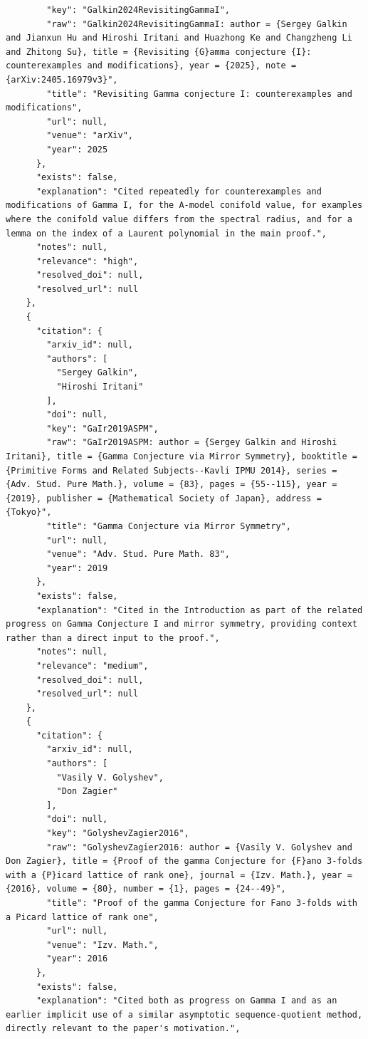 \documentclass[11pt]{article}
\begin{document}
\begin{verbatim}
        "key": "Galkin2024RevisitingGammaI",
        "raw": "Galkin2024RevisitingGammaI: author = {Sergey Galkin and Jianxun Hu and Hiroshi Iritani and Huazhong Ke and Changzheng Li and Zhitong Su}, title = {Revisiting {G}amma conjecture {I}: counterexamples and modifications}, year = {2025}, note = {arXiv:2405.16979v3}",
        "title": "Revisiting Gamma conjecture I: counterexamples and modifications",
        "url": null,
        "venue": "arXiv",
        "year": 2025
      },
      "exists": false,
      "explanation": "Cited repeatedly for counterexamples and modifications of Gamma I, for the A-model conifold value, for examples where the conifold value differs from the spectral radius, and for a lemma on the index of a Laurent polynomial in the main proof.",
      "notes": null,
      "relevance": "high",
      "resolved_doi": null,
      "resolved_url": null
    },
    {
      "citation": {
        "arxiv_id": null,
        "authors": [
          "Sergey Galkin",
          "Hiroshi Iritani"
        ],
        "doi": null,
        "key": "GaIr2019ASPM",
        "raw": "GaIr2019ASPM: author = {Sergey Galkin and Hiroshi Iritani}, title = {Gamma Conjecture via Mirror Symmetry}, booktitle = {Primitive Forms and Related Subjects--Kavli IPMU 2014}, series = {Adv. Stud. Pure Math.}, volume = {83}, pages = {55--115}, year = {2019}, publisher = {Mathematical Society of Japan}, address = {Tokyo}",
        "title": "Gamma Conjecture via Mirror Symmetry",
        "url": null,
        "venue": "Adv. Stud. Pure Math. 83",
        "year": 2019
      },
      "exists": false,
      "explanation": "Cited in the Introduction as part of the related progress on Gamma Conjecture I and mirror symmetry, providing context rather than a direct input to the proof.",
      "notes": null,
      "relevance": "medium",
      "resolved_doi": null,
      "resolved_url": null
    },
    {
      "citation": {
        "arxiv_id": null,
        "authors": [
          "Vasily V. Golyshev",
          "Don Zagier"
        ],
        "doi": null,
        "key": "GolyshevZagier2016",
        "raw": "GolyshevZagier2016: author = {Vasily V. Golyshev and Don Zagier}, title = {Proof of the gamma Conjecture for {F}ano 3-folds with a {P}icard lattice of rank one}, journal = {Izv. Math.}, year = {2016}, volume = {80}, number = {1}, pages = {24--49}",
        "title": "Proof of the gamma Conjecture for Fano 3-folds with a Picard lattice of rank one",
        "url": null,
        "venue": "Izv. Math.",
        "year": 2016
      },
      "exists": false,
      "explanation": "Cited both as progress on Gamma I and as an earlier implicit use of a similar asymptotic sequence-quotient method, directly relevant to the paper's motivation.",

\end{verbatim}
\end{document}
